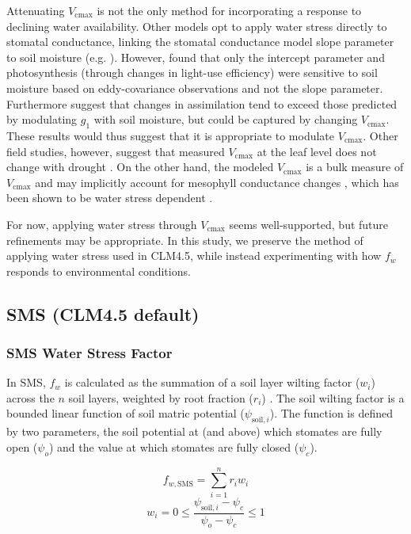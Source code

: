 \documentclass[draft,linenumbers]{agujournal}
\begin{document}
    Attenuating $V_{\text{cmax}}$ is not the only method for incorporating a response to declining water availability. 
    Other models opt to apply water stress directly to stomatal conductance, linking the stomatal conductance model slope parameter to soil moisture 
    (e.g. \cite{dekauwe2015}).
     However, \cite{lin2018} found that only the intercept parameter and photosynthesis (through changes in light-use efficiency) were sensitive to soil moisture based on eddy-covariance observations and not the slope parameter.
    Furthermore \cite{zhou2013} suggest that changes in assimilation tend to exceed those predicted by modulating $g_1$ with soil moisture, but could be captured by changing $V_{\text{cmax}}$. These results would thus suggest that it is appropriate to modulate $V_{\text{cmax}}$.
    Other field studies, however, suggest that measured $V_{\text{cmax}}$ at the leaf level does not change with drought \citep{flexas2004}. 
    On the other hand, the modeled $V_{\text{cmax}}$ is a bulk measure of $V_{\text{cmax}}$ and may implicitly account for mesophyll conductance changes \citep{rogers2017}, which has been shown to be water stress dependent \citep{flexas2012}.

    For now, applying water stress through $V_{\text{cmax}}$ seems well-supported, but future refinements may be appropriate.
    In this study, we preserve the method of applying water stress used in CLM4.5, while instead experimenting with how $f_w$ responds to environmental conditions.
    
    \subsection{SMS (CLM4.5 default)}
    \label{sect:sms}
    \subsubsection{SMS Water Stress Factor}
    \label{sect:fwsms}
    
    In SMS, $f_w$ is calculated as the summation of a soil layer wilting factor ($w_i$) across the $n$ soil layers, weighted by root fraction ($r_i$) \citep{oleson2013}.
    The soil wilting factor is a bounded linear function of soil matric potential ($\psi_{\text{soil},i}$).
    The function is defined by two parameters, the soil potential at (and above) which stomates are fully open ($\psi_o$) and the value at which stomates are fully closed ($\psi_c$).  

    \begin{linenomath*}
    \begin{equation}
     f_{w,\text{SMS}} = \sum_{i=1}^{n}{r_iw_i}
    \label{bt:1}
    \end{equation}
    \begin{equation} 
    \label{bt:2}
    w_i=0 \leq \dfrac{\psi_{\text{soil},i}-\psi_{c}}{\psi_{o}-\psi_{c}} \leq 1
    \end{equation}
    \end{linenomath*}
    
\end{document}
